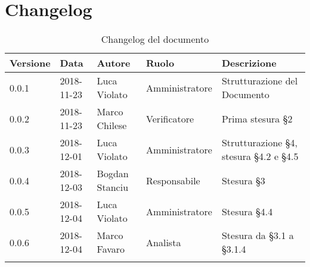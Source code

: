 \section{Changelog}

\begin{center}
\begin{longtable}[c]{|m{}|m{}|m{}|m{}|p{}|}
\hline
\textbf{Versione} & \textbf{Data} & \textbf{Autore} & \textbf{Ruolo} & \textbf{Descrizione} \\
\hline \hline
\endfirsthead
0.0.1 & 2018-11-23 & Luca Violato & Amministratore & Strutturazione del Documento \\
\hline
0.0.2 & 2018-11-23 & Marco Chilese & Verificatore & Prima stesura §2\\
\hline
0.0.3 & 2018-12-01 & Luca Violato & Amministratore & Strutturazione §4, stesura §4.2 e §4.5 \\
\hline
0.0.4 & 2018-12-03 & Bogdan Stanciu & Responsabile & Stesura §3\\
\hline
0.0.5 & 2018-12-04 & Luca Violato & Amministratore & Stesura §4.4 \\
\hline
0.0.6 & 2018-12-04 & Marco Favaro & Analista & Stesura da §3.1 a §3.1.4 \\
\hline
\caption{Changelog del documento}
\end{longtable}
\end{center}